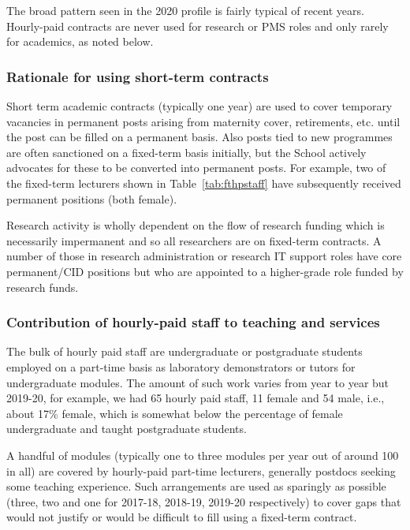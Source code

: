 The broad pattern seen in the 2020 profile is fairly typical
of recent years. Hourly-paid contracts are never used for research 
or PMS roles and only rarely for academics, as noted below.


\subsubsection{Rationale for using short-term contracts}
\label{rationalecontracts}

Short term academic contracts (typically one year) are used 
to cover temporary vacancies in permanent posts arising from
maternity cover, retirements, etc. until the post can be filled on
a permanent basis. Also posts tied to new programmes are often
sanctioned on a fixed-term basis initially, but the School
actively advocates for these to be converted into permanent
posts.
For example, two of the fixed-term lecturers shown in 
Table~\ref{tab:fthpstaff} have subsequently received 
permanent positions (both female).


Research activity is wholly dependent on the flow of research 
funding which is necessarily impermanent and so all researchers 
are on fixed-term contracts. A number of those in research 
administration or research IT support roles have core
permanent/\ac{CID} positions but who are appointed to a 
higher-grade role funded by research funds.

\subsubsection{Contribution of hourly-paid staff to teaching and services}

The bulk of hourly paid staff are undergraduate or postgraduate students
employed on a part-time basis as laboratory demonstrators or tutors for
undergraduate modules. The amount of such work varies from year to year 
but 2019-20, for example, we had 65 hourly paid staff, 11 female and 54 
male, i.e., about 17\% female, which is somewhat below the percentage of 
female  undergraduate and taught postgraduate  students.

A handful of modules (typically one to three modules per year out of 
around 100 in all) are covered by hourly-paid part-time lecturers,
generally postdocs seeking some teaching experience. Such arrangements
are used as sparingly as possible (three, two and one for 2017-18, 
2018-19, 2019-20 respectively) to cover gaps that would not justify 
or would be difficult to fill using a fixed-term contract.





